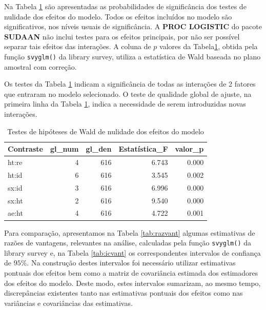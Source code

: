 \documentclass[]{book}
\theoremstyle{definition}
\theoremstyle{definition}
\theoremstyle{definition}
\theoremstyle{remark}
\begin{document}
Na Tabela \ref{tab:testmodlogit} são apresentadas as probabilidades de
significância dos testes de nulidade dos efeitos do modelo. Todos os
efeitos incluídos no modelo são significativos, nos níveis usuais de
significância. A \textbf{PROC LOGISTIC} do pacote \textbf{SUDAAN} não
inclui testes para os efeitos principais, por não ser possível separar
tais efeitos das interações. A coluna de \(p\) valores da
Tabela\ref{tab:testmodlogit}, obtida pela função \texttt{svyglm()} da
library survey, utiliza a estatística de Wald baseada no plano amostral
com correção.

Os testes da Tabela \ref{tab:testmodlogit} indicam a significância de
todas as interações de 2 fatores que entraram no modelo selecionado. O
teste de qualidade global de ajuste, na primeira linha da Tabela
\ref{tab:testmodlogit}, indica a necessidade de serem introduzidas novas
interações.

\begin{table}

\caption{\label{tab:testmodlogit}Testes de hipóteses de Wald de nulidade dos efeitos do modelo}
\centering
\begin{tabular}[t]{lrrrr}
\toprule
Contraste & gl\_num & gl\_den & Estatística\_F & valor\_p\\
\midrule
ht:re & 4 & 616 & 6.743 & 0.000\\
ht:id & 6 & 616 & 3.545 & 0.002\\
sx:id & 3 & 616 & 6.996 & 0.000\\
sx:ht & 2 & 616 & 9.540 & 0.000\\
ae:ht & 4 & 616 & 4.722 & 0.001\\
\bottomrule
\end{tabular}
\end{table}

Para comparação, apresentamos na Tabela \ref{tab:razvant} algumas
estimativas de razões de vantagens, relevantes na análise, calculadas
pela função \texttt{svyglm()} da library survey e, na Tabela
\ref{tab:icvant} os correspondentes intervalos de confiança de \(95\%\).
Na construção destes intervalos foi necessário utilizar estimativas
pontuais dos efeitos bem como a matriz de covariância estimada dos
estimadores dos efeitos do modelo. Deste modo, estes intervalos
sumarizam, ao mesmo tempo, discrepâncias existentes tanto nas
estimativas pontuais dos efeitos como nas variâncias e covariâncias das
estimativas.
\end{document}
